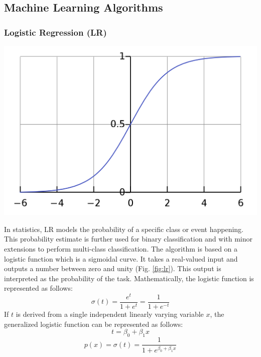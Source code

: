 \documentclass[a4paper, 12pt]{article}
\begin{document}
\subsection{Machine Learning Algorithms}
\subsubsection{Logistic Regression (LR)}
\begin{center}
\includegraphics[scale=0.3]{lr.png}
\label{fig:lr}
\end{center}
In statistics, LR models the probability of a specific class or event happening. This probability estimate is further used for binary classification and with minor extensions to perform multi-class classification. The algorithm is based on a logistic function which is a sigmoidal curve. It takes a real-valued input and outputs a number between zero and unity (Fig. \ref{fig:lr}). This output is interpreted as the probability of the task. Mathematically, the logistic function is represented as follows:
\begin{equation}
\sigma(t) = \frac{e^t}{1 + e^t} = \frac{1}{1 + e^{-t}}
\end{equation}
If \(t\) is derived from a single independent linearly varying variable \(x\), the generalized logistic function can be represented as follows:
\begin{equation}
    t = \beta_0 + \beta_1x
    \end{equation}
    \begin{equation}
    p(x) = \sigma(t) = \frac{1}{1 + e^{\beta_0 + \beta_1x}}
\end{equation}
\vskip 0.2in
\end{document}
